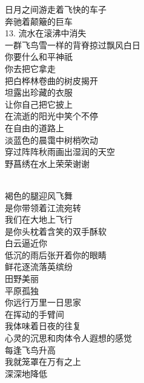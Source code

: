 \documentclass{article}
\begin{document}
日月之间游走着飞快的车子
\\
奔驰着颠簸的巨车 \\ 


13. 流水在滚沸中消失
\\
一群飞鸟雪一样的背脊掠过飘风白日 \\ 


你要什么和平神祇\\
你去把它拿走\\
把白桦林卷曲的树皮揭开\\
坦露出珍藏的衣服
\\
让你自己把它披上 \\ 


在流逝的阳光中笑个不停\\
在自由的道路上\\
淡蓝色的晨霭中树梢吹动\\
穿过阵阵秋雨画出湿润的天空\\
野菖绣在水上荣荣谢谢
\newpage

\\
褐色的腿迎风飞舞 \\ 


是你带领着江流宛转\\
我们在大地上飞行\\
是你头枕着含笑的双手酥软\\
白云逼近你\\
低沉的雨后张开着你的眼睛\\
鲜花逐流落英缤纷\\
田野美丽
\\
平原孤独 \\ 


你远行万里一日思家\\
在挥动的手臂间\\
我体味着日夜的往复\\
心灵的沉思和肉体令人遐想的感觉\\
每逢飞鸟升高\\
我就笼罩在万有之上
\\
深深地降低 \\ 


 

\newpage
\end{document}
